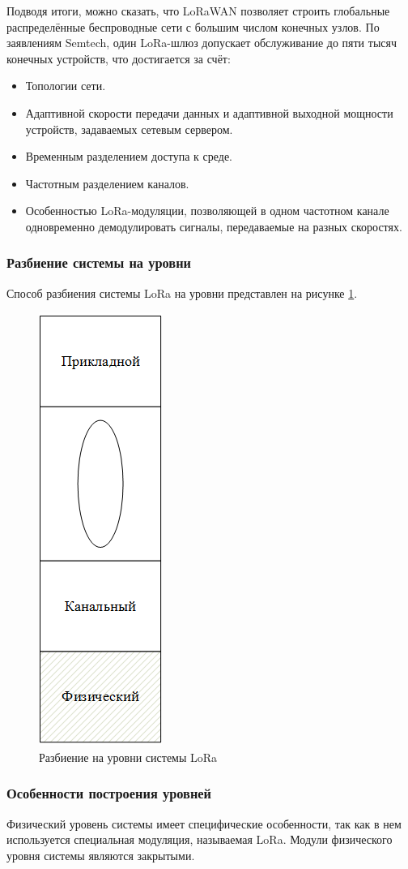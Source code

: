 Подводя итоги, можно сказать, что LoRaWAN позволяет строить глобальные распределённые беспроводные сети с большим числом конечных узлов. По заявлениям Semtech, один LoRa-шлюз допускает обслуживание до пяти тысяч конечных устройств, что достигается за счёт:
\begin{itemize}	
\item Топологии сети.
\item Адаптивной скорости передачи данных и адаптивной выходной мощности устройств, задаваемых сетевым сервером.
\item Временным разделением доступа к среде.
\item Частотным разделением каналов.
\item Особенностью LoRa-модуляции, позволяющей в одном частотном канале одновременно демодулировать сигналы, передаваемые на разных скоростях.
\end{itemize}


\subsubsection{Разбиение системы на уровни}
Способ разбиения системы LoRa на уровни представлен на рисунке
\ref{fig:system_levels_LoRa}.
\begin{figure}[H]
	\centering\includegraphics[width=0.2\linewidth]{img/system_levels_LoRa}
	\caption{Разбиение на уровни системы LoRa}
	\label{fig:system_levels_LoRa}
\end{figure}
\subsubsection{Особенности построения уровней}
Физический уровень системы имеет специфические особенности, так как в нем используется специальная модуляция, называемая LoRa. Модули физического уровня системы являются закрытыми.

